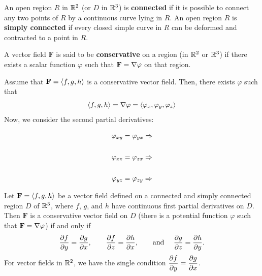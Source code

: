 \documentclass[mathNotesPreamble]{subfiles}
\begin{document}
  \begin{defn*}
    An open region $R$ in $\mathbb{R}^2$ (or $D$ in $\mathbb{R}^3$) is \textbf{connected} if it is possible to connect any two points of $R$ by a continuous curve lying in $R$. An open region $R$ is \textbf{simply connected} if every closed simple curve in $R$ can be deformed and contracted to a point in $R$.
  \end{defn*}
  \pagebreak

  \begin{defn*}
    A vector field $\mathbf F$ is said to be \textbf{conservative} on a region (in $\mathbb{R}^2$ or $\mathbb{R}^3$) if there exists a scalar function $\varphi$ such that $\mathbf F=\nabla\varphi$ on that region.
  \end{defn*}
  Assume that $\mathbf F={\left\langle f,g,h \right\rangle}$ is a conservative vector field. Then, there exists $\varphi$ such that
    \[{\left\langle f,g,h \right\rangle}=\nabla \varphi={\left\langle \varphi_x, \varphi_y, \varphi_z \right\rangle}\]
  Now, we consider the second partial derivatives:

  \noindent
  \begin{minipage}{0.25\linewidth}
    \begin{align*}
      \varphi_{xy}&= \varphi_{yx} \Rightarrow\\[\baselineskip]
      \varphi_{xz}&= \varphi_{zx} \Rightarrow\\[\baselineskip]
      \varphi_{yz}&= \varphi_{zy} \Rightarrow
    \end{align*}
  \end{minipage}

  \begin{thmBox*}
    Let $\mathbf F={\left\langle f,g,h \right\rangle}$ be a vector field defined on a connected and simply connected region $D$ of $\mathbb{R}^3$, where $f$, $g$, and $h$ have continuous first partial derivatives on $D$. Then $\mathbf F$ is a conservative vector field on $D$ (there is a potential function $\varphi$ such that $\mathbf F=\nabla \varphi$) if and only if
      \[\frac{\partial f}{\partial y}=\frac{\partial g}{\partial x},\qquad
      \frac{\partial f}{\partial z}=\frac{\partial h}{\partial x},\qquad
      \textnormal{and } \quad\frac{\partial g}{\partial z}=\frac{\partial h}{\partial y}.\]
    For vector fields in $\mathbb{R}^2$, we have the single condition $\displaystyle\frac{\partial f}{\partial y}=\frac{\partial g}{\partial x}$.
  \end{thmBox*}
  \pagebreak
\end{document}
